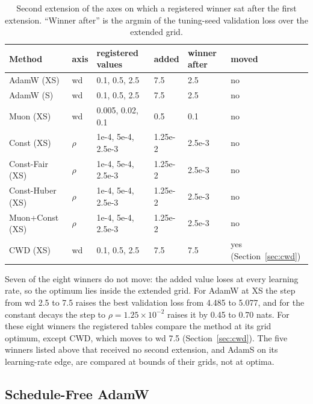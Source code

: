 \documentclass[twoside,11pt]{article}
\begin{document}
\begin{table}[t]
\centering
\footnotesize
\begin{tabular}{@{}llllll@{}}
\toprule
Method & axis & registered values & added & winner after & moved \\
\midrule
AdamW (XS) & wd & 0.1, 0.5, 2.5 & 7.5 & 2.5 & no \\
AdamW (S) & wd & 0.1, 0.5, 2.5 & 7.5 & 2.5 & no \\
Muon (XS) & wd & 0.005, 0.02, 0.1 & 0.5 & 0.1 & no \\
Const (XS) & $\rho$ & 1e-4, 5e-4, 2.5e-3 & 1.25e-2 & 2.5e-3 & no \\
Const-Fair (XS) & $\rho$ & 1e-4, 5e-4, 2.5e-3 & 1.25e-2 & 2.5e-3 & no \\
Const-Huber (XS) & $\rho$ & 1e-4, 5e-4, 2.5e-3 & 1.25e-2 & 2.5e-3 & no \\
Muon+Const (XS) & $\rho$ & 1e-4, 5e-4, 2.5e-3 & 1.25e-2 & 2.5e-3 & no \\
CWD (XS) & wd & 0.1, 0.5, 2.5 & 7.5 & 7.5 & yes (Section~\ref{sec:cwd}) \\
\bottomrule
\end{tabular}
\caption{Second extension of the axes on which a registered winner sat after the first extension. ``Winner after'' is the argmin of the tuning-seed validation loss over the extended grid.}
\label{tab:edges}
\end{table}

Seven of the eight winners do not move: the added value loses at every learning rate, so the optimum lies inside the extended grid. For AdamW at XS the step from wd 2.5 to 7.5 raises the best validation loss from 4.485 to 5.077, and for the constant decays the step to $\rho = 1.25\times10^{-2}$ raises it by 0.45 to 0.70 nats. For these eight winners the registered tables compare the method at its grid optimum, except CWD, which moves to wd 7.5 (Section~\ref{sec:cwd}). The five winners listed above that received no second extension, and AdamS on its learning-rate edge, are compared at bounds of their grids, not at optima.

\subsection{Schedule-Free AdamW}
\label{sec:sf}
\end{document}
